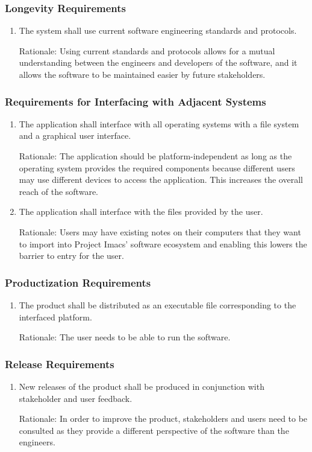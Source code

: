 \documentclass{article}
\begin{document}
\subsubsection{Longevity Requirements}
\begin{enumerate}[LOR1]
\item The system shall use current software engineering standards and protocols.

Rationale: Using current standards and protocols allows for a mutual understanding between the engineers and developers of the software, and it allows the software to be maintained easier by future stakeholders.
\end{enumerate}

\subsubsection{Requirements for Interfacing with Adjacent Systems}
\begin{enumerate}[R{I}{A}1]
\item The application shall interface with all operating systems with a file system and a graphical user interface.

Rationale: The application should be platform-independent as long as the operating system provides the required components because different users may use different devices to access the application. This increases the overall reach of the software.
\item The application shall interface with the files provided by the user.

Rationale: Users may have existing notes on their computers that they want to import into Project Imacs' software ecosystem and enabling this lowers the barrier to entry for the user.
\end{enumerate}

\subsubsection{Productization Requirements}
\begin{enumerate}[PRO1]
\item The product shall be distributed as an executable file corresponding to the interfaced platform.

Rationale: The user needs to be able to run the software.
\end{enumerate}

\subsubsection{Release Requirements}
\begin{enumerate}[RR1]
\item New releases of the product shall be produced in conjunction with stakeholder and user feedback.

Rationale: In order to improve the product, stakeholders and users need to be consulted as they provide a different perspective of the software than the engineers.
\end{enumerate}
\end{document}
